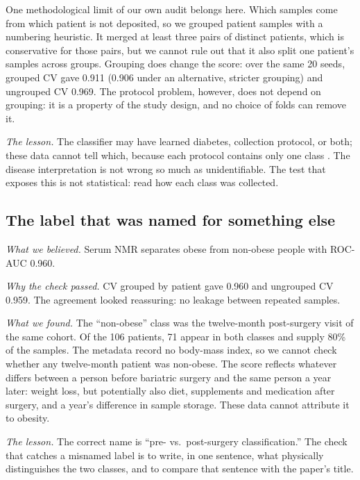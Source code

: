 \documentclass[conference]{IEEEtran}
\begin{document}
One methodological limit of our own audit belongs here. Which samples come
from which patient is not deposited, so we grouped patient samples with a
numbering heuristic. It merged at least three pairs of distinct patients,
which is conservative for those pairs, but we cannot rule out that it also
split one patient's samples across groups. Grouping does change the score:
over the same 20 seeds, grouped CV gave 0.911 (0.906 under an alternative,
stricter grouping) and ungrouped CV 0.969. The protocol problem, however,
does not depend on grouping: it is a property of the study design, and no
choice of folds can remove it.

\emph{The lesson.} The classifier may have learned diabetes, collection
protocol, or both; these data cannot tell which, because each protocol
contains only one class \cite{leek2010}. The disease interpretation is not
wrong so much as unidentifiable. The test that exposes this is not
statistical: read how each class was collected.

\subsection{The label that was named for something else}
\label{sec:story4}

\emph{What we believed.} Serum NMR separates obese from non-obese people with
ROC-AUC 0.960.

\emph{Why the check passed.} CV grouped by patient gave 0.960 and ungrouped CV
0.959. The agreement looked reassuring: no leakage between repeated samples.

\emph{What we found.} The ``non-obese'' class was the twelve-month
post-surgery visit of the same cohort. Of the 106 patients, 71 appear in both
classes and supply 80\% of the samples. The metadata record no body-mass
index, so we cannot check whether any twelve-month patient was non-obese.
The score reflects whatever differs between a person before bariatric
surgery and the same person a year later: weight loss, but potentially also
diet, supplements and medication after surgery, and a year's difference in
sample storage. These data cannot attribute it to obesity.

\emph{The lesson.} The correct name is ``pre- vs.\ post-surgery
classification.'' The check that catches a misnamed label is to write, in
one sentence, what physically distinguishes the two classes, and to compare
that sentence with the paper's title.

\end{document}
